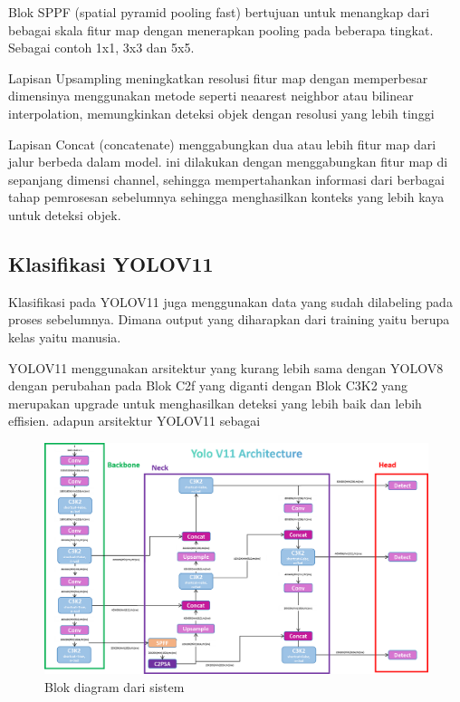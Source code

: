 Blok SPPF (spatial pyramid pooling fast) bertujuan untuk menangkap dari bebagai skala fitur map dengan menerapkan pooling pada beberapa tingkat. Sebagai contoh 1x1, 3x3 dan 5x5.

Lapisan Upsampling meningkatkan resolusi fitur map dengan memperbesar dimensinya menggunakan metode seperti neaarest neighbor atau bilinear interpolation, memungkinkan deteksi objek dengan resolusi yang lebih tinggi

Lapisan Concat (concatenate) menggabungkan dua atau lebih fitur map dari jalur berbeda dalam model. ini dilakukan dengan menggabungkan fitur map di sepanjang dimensi channel, sehingga mempertahankan  informasi dari berbagai tahap pemrosesan sebelumnya sehingga menghasilkan konteks yang lebih kaya untuk deteksi objek.

\subsection{Klasifikasi YOLOV11}
Klasifikasi pada YOLOV11 juga menggunakan data yang sudah dilabeling pada proses sebelumnya. Dimana output yang diharapkan dari training yaitu berupa kelas yaitu manusia.

YOLOV11 menggunakan arsitektur yang kurang lebih sama dengan YOLOV8 dengan perubahan pada Blok C2f yang diganti dengan Blok C3K2 yang merupakan upgrade untuk menghasilkan deteksi yang lebih baik dan lebih effisien. adapun arsitektur YOLOV11 sebagai 

\begin{figure} [H] \centering
  \includegraphics[scale=0.25]{gambar/yolov11.png}
  \caption{Blok diagram dari sistem}
  \label{fig:rancangan penelitian}
\end{figure}

